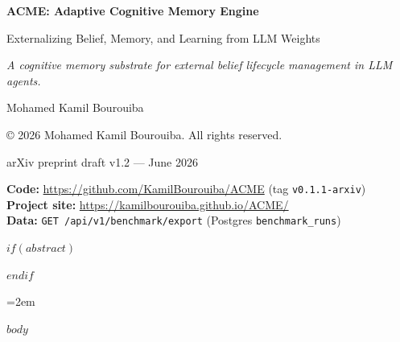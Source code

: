 \documentclass[11pt,a4paper]{article}
\newcommand{\papertagline}{A cognitive memory substrate for external belief lifecycle management in LLM agents.}
\begin{document}



\begin{center}
  \vspace*{0.12in}
  {\sffamily\fontsize{24}{29}\selectfont\bfseries
   ACME: Adaptive Cognitive Memory Engine\par}
  \vspace{0.85em}
  {\sffamily\Large
   Externalizing Belief, Memory, and Learning from LLM Weights\par}
  \vspace{1.1em}
  {\normalsize\itshape\papertagline\par}
  \vspace{1.15em}
  {\normalsize Mohamed Kamil Bourouiba\par}
  \vspace{0.35em}
  {\footnotesize\copyright{} 2026 Mohamed Kamil Bourouiba. All rights reserved.\par}
  \vspace{0.45em}
  {\small arXiv preprint draft v1.2 --- June 2026\par}
  \vspace{0.85em}
  \acmeTitleStrip
  \vspace{0.65em}
  \begin{metabox}
    \begin{minipage}{0.88\linewidth}
      \footnotesize\sffamily\color{acmefiggray}
      \textbf{Code:} \url{https://github.com/KamilBourouiba/ACME} (tag \texttt{v0.1.1-arxiv})\\
      \textbf{Project site:} \url{https://kamilbourouiba.github.io/ACME/}\\
      \textbf{Data:} \texttt{GET /api/v1/benchmark/export} (Postgres \texttt{benchmark\_runs})
    \end{minipage}
  \end{metabox}
  \vspace{0.75em}
\end{center}

$if(abstract)$
\begin{abstract}
$abstract$
\end{abstract}
$endif$

\twocolumn
\raggedbottom
\emergencystretch=2em

$body$
\end{document}
